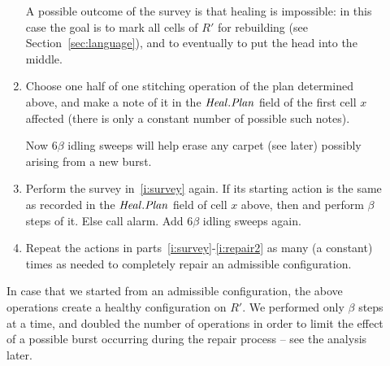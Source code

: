 \documentclass[12pt]{memoir}
\newcommand{\fld}[1]{\ensuremath{\textit{#1\/}}}
\newcommand{\R}{R}
\newcommand{\Heal}{\fld{Heal}}
\newcommand{\Plan}{\fld{Plan}}
\newcommand{\Stage}{\fld{Stage}}
\newcommand{\Sweep}{\fld{Sw}}
\newcommand{\Committing}{\mathrm{Committing}}
\newcommand{\Planning}{\mathrm{Planing}}
\begin{document}
\begin{description}
\begin{enumerate}[label=R\arabic*, ref=R\arabic*]

A possible outcome of the survey is that healing is impossible: in this case the goal
is to mark all cells of \( \R' \) for rebuilding (see Section~\ref{sec:language}), and to
eventually to put the head into the middle.

\item\label{i:repair1} Choose one half of one stitching operation of the plan 
determined above, and make a note of it in the \( \Heal.\Plan \) field of the first
cell \( x \) affected (there is only a constant number of possible such notes).

Now \( 6\beta \) idling sweeps will help erase any carpet (see later) possibly arising from
a new burst.

\item\label{i:repair2} Perform the survey in~\ref{i:survey} again.
If its starting action is the same as recorded in the \( \Heal.\Plan \) field of cell \( x \) above,
then and perform \( \beta \) steps of it.
Else call alarm.
Add \( 6\beta \) idling sweeps again.

\item\label{i:repair-repeat} Repeat the actions in parts~\ref{i:survey}-\ref{i:repair2}
as many (a constant) times as needed to completely repair an admissible 
configuration.

\end{enumerate}

In case that we started from an admissible configuration, the above operations
create a healthy configuration on \( \R' \).
We performed only \( \beta \) steps at a time, and
doubled the number of operations in order to limit the effect
of a possible burst occurring during the repair process -- see the analysis later.




\end{description}
\end{document}
